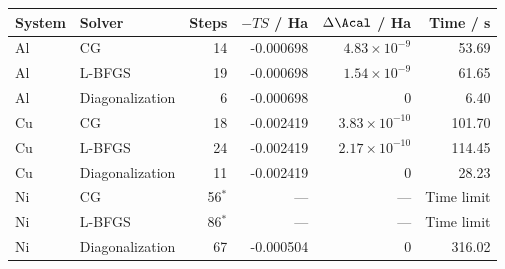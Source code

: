 \begin{tabular}{llrrrr}\toprule
System & Solver & Steps & $-TS$ / Ha & $\Delta\Acal$ / Ha & Time / s\\\midrule
Al & CG & 14 & -0.000698 & $4.83\times10^{-9}$ & 53.69\\
Al & L-BFGS & 19 & -0.000698 & $1.54\times10^{-9}$ & 61.65\\
Al & Diagonalization & 6 & -0.000698 & $0$ & 6.40\\
Cu & CG & 18 & -0.002419 & $3.83\times10^{-10}$ & 101.70\\
Cu & L-BFGS & 24 & -0.002419 & $2.17\times10^{-10}$ & 114.45\\
Cu & Diagonalization & 11 & -0.002419 & $0$ & 28.23\\
Ni & CG & 56$^{*}$ & --- & --- & Time limit\\
Ni & L-BFGS & 86$^{*}$ & --- & --- & Time limit\\
Ni & Diagonalization & 67 & -0.000504 & $0$ & 316.02\\
\bottomrule\end{tabular}

